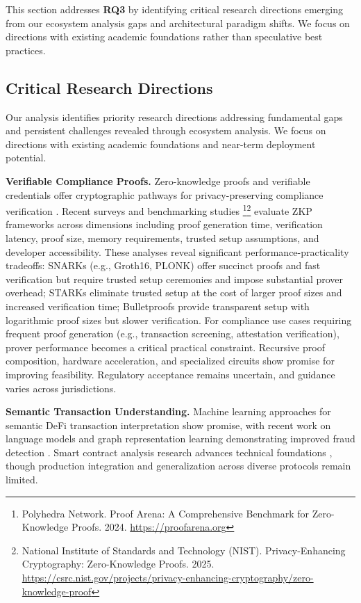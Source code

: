 \documentclass[conference,compsoc]{IEEEtran}
\begin{document}
This section addresses \textbf{RQ3} by identifying critical research directions emerging from our ecosystem analysis gaps and architectural paradigm shifts. We focus on directions with existing academic foundations rather than speculative best practices.

\subsection{Critical Research Directions}

Our analysis identifies priority research directions addressing fundamental gaps and persistent challenges revealed through ecosystem analysis. We focus on directions with existing academic foundations and near-term deployment potential.

\noindent\textbf{Verifiable Compliance Proofs.}
Zero-knowledge proofs and verifiable credentials offer cryptographic pathways for privacy-preserving compliance verification \cite{ben-sasson2017scalablezeroknowledge,yang2024researchidentitydata,zhang2024blockchainzeroknowledge}. Recent surveys and benchmarking studies \footnote{Polyhedra Network. Proof Arena: A Comprehensive Benchmark for Zero-Knowledge Proofs. 2024. \url{https://proofarena.org}}\footnote{National Institute of Standards and Technology (NIST). Privacy-Enhancing Cryptography: Zero-Knowledge Proofs. 2025. \url{https://csrc.nist.gov/projects/privacy-enhancing-cryptography/zero-knowledge-proof}} evaluate ZKP frameworks across dimensions including proof generation time, verification latency, proof size, memory requirements, trusted setup assumptions, and developer accessibility. These analyses reveal significant performance-practicality tradeoffs: SNARKs (e.g., Groth16, PLONK) offer succinct proofs and fast verification but require trusted setup ceremonies and impose substantial prover overhead; STARKs eliminate trusted setup at the cost of larger proof sizes and increased verification time; Bulletproofs provide transparent setup with logarithmic proof sizes but slower verification. For compliance use cases requiring frequent proof generation (e.g., transaction screening, attestation verification), prover performance becomes a critical practical constraint. Recursive proof composition, hardware acceleration, and specialized circuits show promise for improving feasibility. Regulatory acceptance remains uncertain, and guidance varies across jurisdictions.

\noindent\textbf{Semantic Transaction Understanding.}
Machine learning approaches for semantic DeFi transaction interpretation show promise, with recent work on language models and graph representation learning demonstrating improved fraud detection \cite{sun2025ethereumfrauddetection,azad2025machinelearningblockchain}. Smart contract analysis research advances technical foundations \cite{bhargavan2016formalverificationsmart,chen2024safecheckdetectingsmart,liao2024smartcontractvulnerability}, though production integration and generalization across diverse protocols remain limited.
\end{document}
